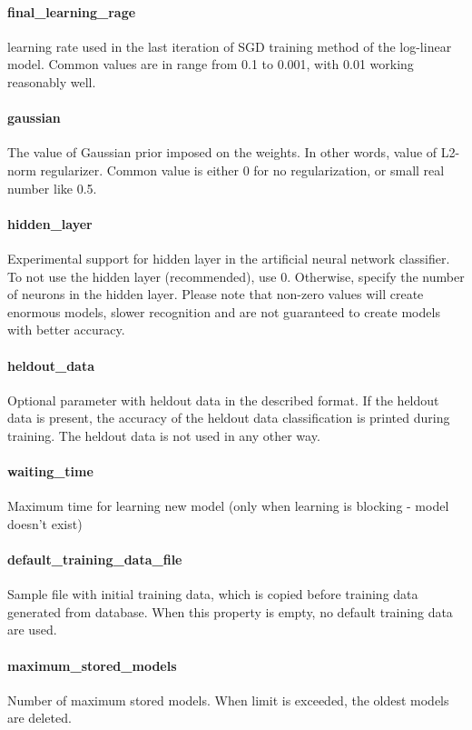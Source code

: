 \documentclass[12pt,a4paper]{report}
\begin{document}
\paragraph{final\_learning\_rage}
learning rate used in the last iteration of SGD training method of the log-linear
model. Common values are in range from 0.1 to 0.001, with 0.01 working reasonably well.

\paragraph{gaussian}
The value of Gaussian prior imposed on the weights. In other words, value of
L2-norm regularizer. Common value is either 0 for no regularization, or small
real number like 0.5.

\paragraph{hidden\_layer}
Experimental support for hidden layer in the artificial neural network classifier.
To not use the hidden layer (recommended), use 0. Otherwise, specify the number
of neurons in the hidden layer. Please note that non-zero values will create
enormous models, slower recognition and are not guaranteed to create models with
better accuracy.

\paragraph{heldout\_data}
Optional parameter with heldout data in the described format. If the heldout data
is present, the accuracy of the heldout data classification is printed during
training. The heldout data is not used in any other way.

\paragraph{waiting\_time}
Maximum time for learning new model (only when learning is blocking - model doesn't exist)

\paragraph{default\_training\_data\_file}
Sample file with initial training data, which is copied before training data
generated from database. When this property is empty, no default training data
are used.

\paragraph{maximum\_stored\_models}
Number of maximum stored models. When limit is exceeded, the oldest models are deleted.
\end{document}
